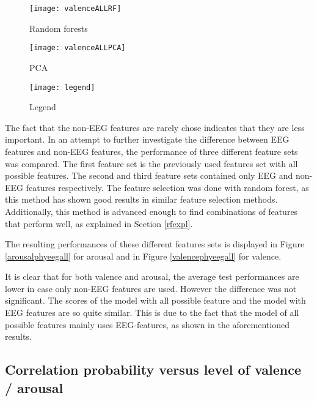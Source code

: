 \begin{figure}[!tbp]
  \begin{minipage}[b]{0.3\textwidth}
    \texttt{[image: valenceALLRF]}
    \caption{Random forests}
  \end{minipage}
  \hfill
  \begin{minipage}[b]{0.3\textwidth}
    \texttt{[image: valenceALLPCA]} %
    \caption{PCA}
  \end{minipage}
  \hfill
  \begin{minipage}[b]{0.3\textwidth}
    \texttt{[image: legend]}
    \caption{Legend\label{valencepieslegend}}
  \end{minipage}
\end{figure}
\clearpage

The fact that the non-EEG features are rarely chose indicates that they are less important. In an attempt to further investigate the difference between EEG features and non-EEG features, the performance of three different feature sets was compared. The first feature set is the previously used features set with all possible features. The second and third feature sets contained only EEG and non-EEG features respectively. The feature selection was done with random forest, as this method has shown good results in similar feature selection methods. Additionally, this method is advanced enough to find combinations of features that perform well, as explained in Section \ref{rfexpl}.

\npar

The resulting performances of these different features sets is displayed in Figure \ref{arousalphyeegall} for arousal and in Figure \ref{valencephyeegall} for valence.



It is clear that for both valence and arousal, the average test performances are lower in case only non-EEG features are used. However the difference was not significant. %
The scores of the model with all possible feature and the model with EEG features are so quite similar. This is due to the fact that the model of all possible features mainly uses EEG-features, as shown in the aforementioned results. 


\subsection{Correlation probability versus level of valence / arousal}


